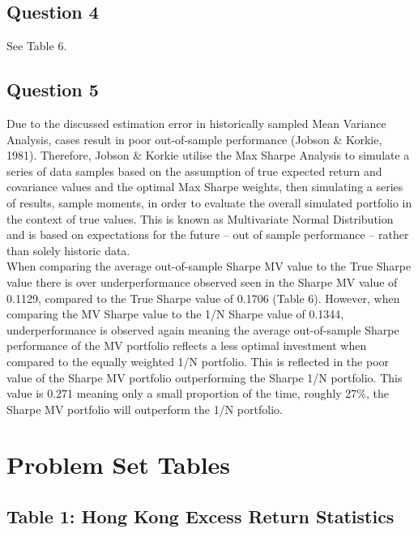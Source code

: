 \documentclass[11pt, english]{article}
\begin{document}
\newpage

	\subsection{Question 4}

	See Table 6.

\newpage

	\subsection{Question 5}

	Due to the discussed estimation error in historically sampled Mean Variance Analysis, cases result in poor out-of-sample performance (Jobson \& Korkie, 1981). Therefore, Jobson \& Korkie utilise the Max Sharpe Analysis to simulate a series of data samples based on the assumption of true expected return and covariance values and the optimal Max Sharpe weights, then simulating a series of results, sample moments, in order to evaluate the overall simulated portfolio in the context of true values. This is known as Multivariate Normal Distribution and is based on expectations for the future – out of sample performance – rather than solely historic data.\\

	When comparing the average out-of-sample Sharpe MV value to the True Sharpe value there is over underperformance observed seen in the Sharpe MV value of 0.1129, compared to the True Sharpe value of 0.1706 (Table 6). However, when comparing the MV Sharpe value to the 1/N Sharpe value of 0.1344, underperformance is observed again meaning the average out-of-sample Sharpe performance of the MV portfolio reflects a less optimal investment when compared to the equally weighted 1/N portfolio. This is reflected in the poor value of the Sharpe MV portfolio outperforming the Sharpe 1/N portfolio. This value is 0.271 meaning only a small proportion of the time, roughly 27\%, the Sharpe MV portfolio will outperform the 1/N portfolio.

\newpage

\section{Problem Set Tables}

	\subsection{Table 1: Hong Kong Excess Return Statistics}
\end{document}
